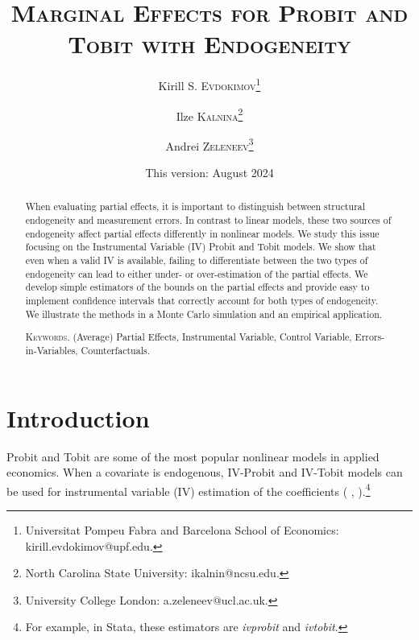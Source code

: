 \documentclass[12pt]{article}
\begin{document}
\title{\textsc{Marginal Effects for Probit and Tobit with Endogeneity}}
\author{Kirill S. \textsc{Evdokimov}\thanks{%
Universitat Pompeu Fabra and Barcelona School of Economics: \textsf{%
kirill.evdokimov@upf.edu}.} \and Ilze \textsc{Kalnina}\thanks{%
North Carolina State University: \textsf{ikalnin@ncsu.edu}.} \and Andrei 
\textsc{Zeleneev}\thanks{%
University College London: \textsf{a.zeleneev@ucl.ac.uk}.\tiny\newline $ $ }}
\date{This version: August 2024}
\maketitle

    \begin{abstract}

      When evaluating partial effects, it is important to distinguish between structural endogeneity and measurement errors. In contrast to linear models, these two sources of endogeneity affect partial effects differently in nonlinear models. We study this issue focusing on the Instrumental Variable (IV) Probit and Tobit models. We show that even when a valid IV is available, failing to differentiate between the two types of endogeneity can lead to either under- or over-estimation of the partial effects. We develop simple estimators of the bounds on the partial effects and provide easy to implement confidence intervals that correctly account for both types of endogeneity. We illustrate the methods in a Monte Carlo simulation and an empirical application.

      \bigskip

      \textsc{Keywords.} (Average) Partial Effects, Instrumental Variable, Control Variable, Errors-in-Variables, Counterfactuals.
    \end{abstract}

\newpage

\section{Introduction}

Probit and Tobit are some of the most popular nonlinear models in applied
economics. When a covariate is endogenous, IV-Probit and IV-Tobit models can
be used for instrumental variable (IV) estimation of the coefficients (%
\citealp{SmithBlundell1986Ecta}, \citealp{RiversVuong1988JoE}).\footnote{%
For example, in Stata, these estimators are \textit{ivprobit} and \textit{%
ivtobit}.}
\end{document}
